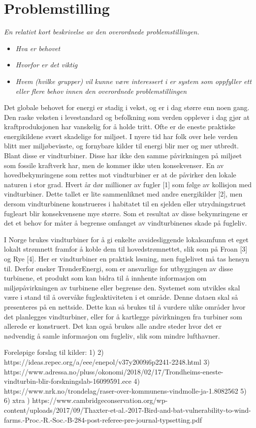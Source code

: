 \section{Problemstilling}
\label{sec:problemstilling}
\textit{En relativt kort beskrivelse av den overordnede problemstillingen.}
\begin{itemize}
\item \textit{Hva er behovet}
\item \textit{Hvorfor er det viktig}
\item \textit{Hvem (hvilke grupper) vil kunne være interessert i er system som oppfyller ett eller flere behov innen den overordnede problemstillingen}
\end{itemize}


Det globale behovet for energi er stadig i vekst, og er i dag større enn noen gang. Den raske veksten i levestandard og befolkning som verden opplever i dag gjør at kraftproduksjonen har vanskelig for å holde tritt. Ofte er de eneste praktiske energikildene svært skadelige for miljøet. I nyere tid har folk over hele verden blitt mer miljøbevisste, og fornybare kilder til energi blir mer og mer utbredt. Blant disse er vindturbiner. Disse har ikke den samme påvirkningen på miljøet som fossile kraftverk har, men de kommer ikke uten konsekvenser. En av hovedbekymringene som rettes mot vindturbiner er at de påvirker den lokale naturen i stor grad. Hvert år dør millioner av fugler [1] som følge av kollisjon med vindturbiner. Dette tallet er lite sammenliknet med andre energikilder [2], men dersom vindturbinene konstrueres i habitatet til en sjelden eller utrydningstruet fugleart blir konsekvensene mye større. Som et resultat av disse bekymringene er det et behov for måter å begrense omfanget av vindturbinenes skade på fugleliv.

I Norge brukes vindturbiner for å gi enkelte avsidesliggende lokalsamfunn et eget lokalt strømnett framfor å koble dem til hovedstrømnettet, slik som på Froan [3] og Rye [4]. Her er vindturbiner en praktisk løsning, men fuglelivet må tas hensyn til. Derfor ønsker TrønderEnergi, som er ansvarlige for utbyggingen av disse turbinene, et produkt som kan bidra til å innhente informasjon om miljøpåvirkningen av turbinene eller begrense den. Systemet som utvikles skal være i stand til å overvåke fugleaktiviteten i et område. Denne dataen skal så presenteres på en nettside. Dette kan så brukes til å vurdere ulike områder hvor det planlegges vindturbiner, eller for å kartlegge påvirkningen fra turbiner som allerede er konstruert. Det kan også brukes alle andre steder hvor det er nødvendig å samle informasjon om fugleliv, slik som mindre lufthavner.

Foreløpige forslag til kilder:
1) 
2) https://ideas.repec.org/a/eee/enepol/v37y2009i6p2241-2248.html
3) https://www.adressa.no/pluss/okonomi/2018/02/17/Trondheims-eneste-vindturbin-blir-forskningslab-16099591.ece
4) https://www.nrk.no/trondelag/raser-over-kommunens-vindmolle-ja-1.8082562
5) 
6) 
xtra
) https://www.cambridgeconservation.org/wp-content/uploads/2017/09/Thaxter-et-al.-2017-Bird-and-bat-vulnerability-to-wind-farms.-Proc.-R.-Soc.-B-284-post-referee-pre-journal-typsetting.pdf